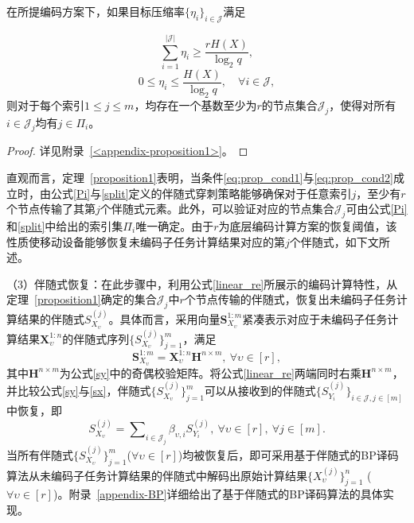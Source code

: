 \begin{theorem}\label{proposition1}
在所提编码方案下，如果目标压缩率$\{\eta_i\}_{i\in\mathcal{J}}$满足


	\begin{equation}
		\sum_{i=1}^{|\mathcal{J}|} \eta_i \geq \frac{rH(X)}{\log_2 q},
		\label{eq:prop_cond1}
	\end{equation}
	\begin{equation}
		0 \leq \eta_i \leq \frac{H(X)}{\log_2 q}, \quad \forall i \in \mathcal{J},
		\label{eq:prop_cond2}
	\end{equation}
        则对于每个索引$1\leq j\leq m$，均存在一个基数至少为$r$的节点集合$\mathcal{J}_j$，使得对所有$i\in\mathcal{J}_j$均有$j\in\Pi_i$。

\end{theorem}
\begin{proof}
	详见附录~\ref{<appendix-proposition1>}。
\end{proof}

直观而言，定理~\ref{proposition1}表明，当条件\eqref{eq:prop_cond1}与\eqref{eq:prop_cond2}成立时，由公式\eqref{Pi}与\eqref{split}定义的伴随式穿刺策略能够确保对于任意索引$j
$，至少有$r$个节点传输了其第$j$个伴随式元素。此外，可以验证对应的节点集合$\mathcal{J}_j$可由公式\eqref{Pi}和\eqref{split}中给出的索引集$\Pi_i$唯一确定。由于$r$为底层编码计算方案的恢复阈值，该性质使移动设备能够恢复未编码子任务计算结果对应的第$j$个伴随式，如下文所述。

（3）伴随式恢复：在此步骤中，利用公式\eqref{linear_re}所展示的编码计算特性，从定理~\ref{proposition1}确定的集合$\mathcal{J}_j$中$r$个节点传输的伴随式，恢复出未编码子任务计算结果的伴随式$S_{X_\upsilon}^{(j)}$。具体而言，采用向量$\mathbf{S}_{X_\upsilon}^{1:m}$紧凑表示对应于未编码子任务计算结果$\mathbf{X}_\upsilon^{1:n}$的伴随式序列$\{S_{X_\upsilon}^{(j)}\}_{j=1}^m$，满足
\begin{equation}
\mathbf{S}_{X_\upsilon}^{1:m}=\mathbf{X}_\upsilon^{1:n}\mathbf{H}^{n\times m},~\forall \upsilon\in[r],\label{sx}
\end{equation}
其中$\mathbf{H}^{n\times m}$为公式\eqref{sy}中的奇偶校验矩阵。将公式\eqref{linear_re}两端同时右乘$\mathbf{H}^{n\times
	m}$，并比较公式\eqref{sy}与\eqref{sx}，伴随式$\{S_{X_\upsilon}^{(j)}\}_{j=1}^m$可以从接收到的伴随式$\{S_{Y_i}^{(j)}\}_{i\in\mathcal{J},j\in[m]}$中恢复，即
\begin{equation}
S_{X_\upsilon}^{(j)}=\sum\nolimits_{i\in \mathcal{J}_j} \beta_{\upsilon,i}S_{Y_i}^{(j)},~ \forall \upsilon\in[r],~\forall j\in [m].\label{linear}
\end{equation}
当所有伴随式$\{S_{X_\upsilon}^{(j)}\}_{j=1}^m$($\forall\upsilon\in[r]$)均被恢复后，即可采用基于伴随式的BP译码算法从未编码子任务计算结果的伴随式中解码出原始计算结果$\{X_\upsilon^{(j)}\}_{j=1}^n$ ($\forall\upsilon\in[r]$)。附录~\ref{appendix-BP}详细给出了基于伴随式的BP译码算法的具体实现。

